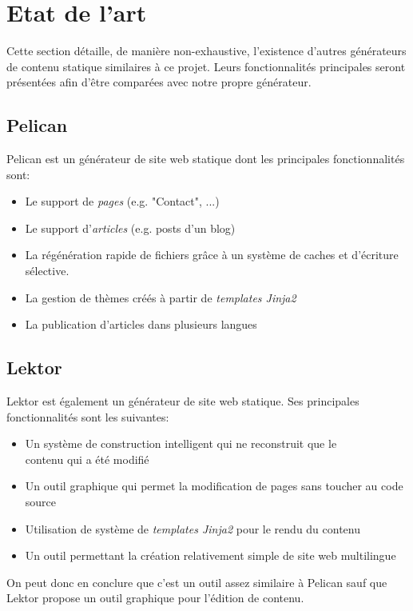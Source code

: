 \section{Etat de l'art}
	
	Cette section détaille, de manière non-exhaustive, l'existence d'autres générateurs de contenu statique similaires à ce projet. Leurs fonctionnalités principales seront présentées afin d'être comparées avec notre propre générateur.
	
	\subsection*{Pelican}
	Pelican \cite{Pelican} est un générateur de site web statique dont les principales fonctionnalités sont:
	\begin{itemize}
		\item Le support de \textit{pages} (e.g. "Contact", ...)
		\item Le support d'\textit{articles} (e.g. posts d'un blog)
		\item La régénération rapide de fichiers grâce à un système de caches et d'écriture sélective.
		\item La gestion de thèmes créés à partir de \textit{templates Jinja2}
		\item La publication d'articles dans plusieurs langues
	\end{itemize}
	
	\subsection*{Lektor}
	Lektor \cite{Lektor} est également un générateur de site web statique. Ses principales fonctionnalités sont les suivantes:
	
	\begin{itemize}
		\item Un système de construction intelligent qui ne reconstruit que le \\contenu qui a été modifié
		\item Un outil graphique qui permet la modification de pages sans toucher au code source
		\item Utilisation de système de \textit{templates Jinja2} pour le rendu du contenu
		\item Un outil permettant la création relativement simple de site web multilingue
	\end{itemize}
	
	On peut donc en conclure que c'est un outil assez similaire à Pelican sauf que Lektor propose un outil graphique pour l'édition de contenu.
	
